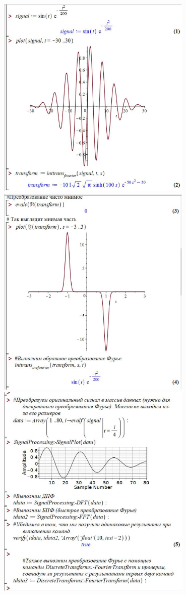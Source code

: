 {\begin{center}{
  \includegraphics[width=0.7\textwidth]{signal1.png} 
  \includegraphics[width=0.7\textwidth]{signal2.png} 
  \includegraphics[width=0.7\textwidth]{signal3.png} 
}
\end{center}}
